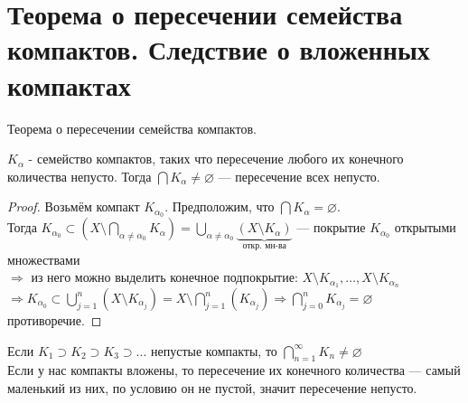 \section{Теорема о пересечении семейства компактов. Следствие о вложенных компактах}

\begin{theorem-non}
    Теорема о пересечении семейства компактов.

    $K_{\alpha}$ - семейство компактов, таких что пересечение любого их конечного количества непусто.
    Тогда $\bigcap K_{\alpha} \neq \varnothing$ --- пересечение всех непусто.
    
    \begin{proof}
        Возьмём компакт $K_{\alpha_0}$. Предположим, что $\bigcap K_{\alpha} = \varnothing$. \\
        Тогда $K_{\alpha_0} \subset (X \setminus \bigcap\limits_{\alpha \neq \alpha_{0}} K_{\alpha}) = 
        \bigcup\limits_{\alpha \neq \alpha_{0}} \underbrace{(X \setminus K_{\alpha})}_\text{откр. мн-ва}$ --- покрытие $K_{\alpha_{0}}$ открытыми множествами \\
        $\Longrightarrow$ из него можно выделить конечное подпокрытие: $X \setminus K_{\alpha_{1}}, \dots, X \setminus K_{\alpha_{n}}$ \\
        $\Longrightarrow K_{\alpha_0} \subset \bigcup\limits_{j=1}^{n}(X \setminus K_{\alpha_{j}}) = X \setminus \bigcap\limits_{j = 1}^{n}(K_{\alpha_{j}}) \Longrightarrow
        \bigcap\limits_{j=0}^{n} K_{\alpha_{j}} = \varnothing$ противоречие. 
    \end{proof}

\end{theorem-non}

\follow \quad Если $K_1 \supset K_2 \supset K_3 \supset ...$ непустые компакты, то $\bigcap\limits_{n=1}^{\infty} K_n \neq \varnothing$ \\
Если у нас компакты вложены, то пересечение их конечного количества --- самый маленький из них, по условию он не пустой, значит пересечение непусто.